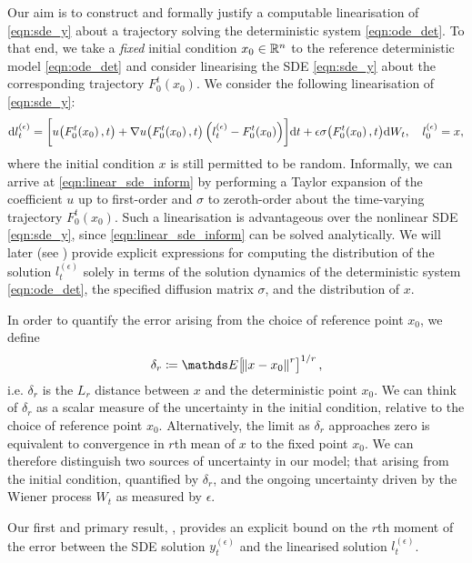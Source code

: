 Our aim is to construct and formally justify a computable linearisation of \cref{eqn:sde_y} about a trajectory solving the deterministic system \cref{eqn:ode_det}.
To that end, we take a \emph{fixed} initial condition \(x_0 \in \mathbb{R}^n\) to the reference deterministic model \cref{eqn:ode_det} and consider linearising the SDE \cref{eqn:sde_y} about the corresponding trajectory \(F_0^t\!\left(x_0\right)\).
We consider the following linearisation of \cref{eqn:sde_y}:
\begin{equation}
	\dif l_t^{(\epsilon)} = \left[u\!\left(F_0^t\!\left(x_0\right), t\right) + \nabla u\!\left(F_0^t\!\left(x_0\right), t\right)\left(l_t^{(\epsilon)} - F_0^t\!\left(x_0\right)\right)\right] \! \dif t + \epsilon\sigma\!\left(F_0^t\!\left(x_0\right), t\right) \! \dif W_t, \quad l_0^{(\epsilon)} = x,
	\label{eqn:linear_sde_inform}
\end{equation}
where the initial condition \(x \) is still permitted to be random.
Informally, we can arrive at \cref{eqn:linear_sde_inform} by performing a Taylor expansion of the coefficient \(u\) up to first-order and \(\sigma\) to zeroth-order about the time-varying trajectory \(F_0^t\!\left(x_0\right)\).
Such a linearisation is advantageous over the nonlinear SDE \cref{eqn:sde_y}, since \cref{eqn:linear_sde_inform} can be solved analytically.
We will later (see ) provide explicit expressions for computing the distribution of the solution \(l_t^{(\epsilon)}\) solely in terms of the solution dynamics of the deterministic system \cref{eqn:ode_det}, the specified diffusion matrix \(\sigma\), and the distribution of \(x\).


In order to quantify the error arising from the choice of reference point \(x_0\), we define
\[
	\delta_r \coloneqq \avg{\norm{x - x_0}^r}^{1/r},
\]
i.e. \(\delta_r\) is the \(L_r\) distance between \(x\) and the deterministic point \(x_0\).
We can think of \(\delta_r\) as a scalar measure of the uncertainty in the initial condition, relative to the choice of reference point \(x_0\).
Alternatively, the limit as \(\delta_r\) approaches zero is equivalent to convergence in \(r\)th mean of \(x\) to the fixed point \(x_0\).
We can therefore distinguish two sources of uncertainty in our model; that arising from the initial condition, quantified by \(\delta_r\), and the ongoing uncertainty driven by the Wiener process \(W_t\) as measured by \(\epsilon\).

Our first and primary result, , provides an explicit bound on the \(r\)th moment of the error between the SDE solution \(y_t^{(\epsilon)}\) and the linearised solution \(l_t^{(\epsilon)}\).


